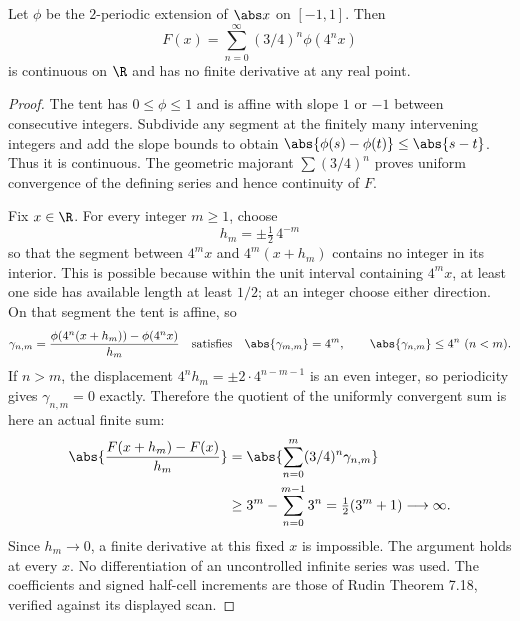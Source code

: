 \begin{construction}
Let $\phi$ be the $2$-periodic extension of $\abs x$ on $[-1,1]$. Then
\[F(x)=\sum_{n=0}^\infty(3/4)^n\phi(4^nx)\]
is continuous on $\R$ and has no finite derivative at any real point.
\end{construction}
\begin{proof}
The tent has $0\leq\phi\leq1$ and is affine with slope $1$ or $-1$ between consecutive integers. Subdivide any segment at the finitely many intervening integers and add the slope bounds to obtain $\abs{\phi(s)-\phi(t)}\leq\abs{s-t}$. Thus it is continuous. The geometric majorant $\sum(3/4)^n$ proves uniform convergence of the defining series and hence continuity of $F$.

Fix $x\in\R$. For every integer $m\geq1$, choose
\[h_m=\pm\tfrac12\,4^{-m}\]
so that the segment between $4^mx$ and $4^m(x+h_m)$ contains no integer in its interior. This is possible because within the unit interval containing $4^mx$, at least one side has available length at least $1/2$; at an integer choose either direction. On that segment the tent is affine, so
\[\gamma_{n,m}=\frac{\phi(4^n(x+h_m))-\phi(4^nx)}{h_m}\quad\text{satisfies}\quad
\abs{\gamma_{m,m}}=4^m,\qquad\abs{\gamma_{n,m}}\leq4^n\ (n<m).\]
If $n>m$, the displacement $4^nh_m=\pm2\cdot4^{n-m-1}$ is an even integer, so periodicity gives $\gamma_{n,m}=0$ exactly. Therefore the quotient of the uniformly convergent sum is here an actual finite sum:
\[\begin{split}
\abs{\frac{F(x+h_m)-F(x)}{h_m}}
&=\abs{\sum_{n=0}^m(3/4)^n\gamma_{n,m}}\\
&\geq3^m-\sum_{n=0}^{m-1}3^n=\tfrac12(3^m+1)\longrightarrow\infty.
\end{split}\]
Since $h_m\to0$, a finite derivative at this fixed $x$ is impossible. The argument holds at every $x$. No differentiation of an uncontrolled infinite series was used. The coefficients and signed half-cell increments are those of Rudin Theorem 7.18, verified against its displayed scan.
\end{proof}
